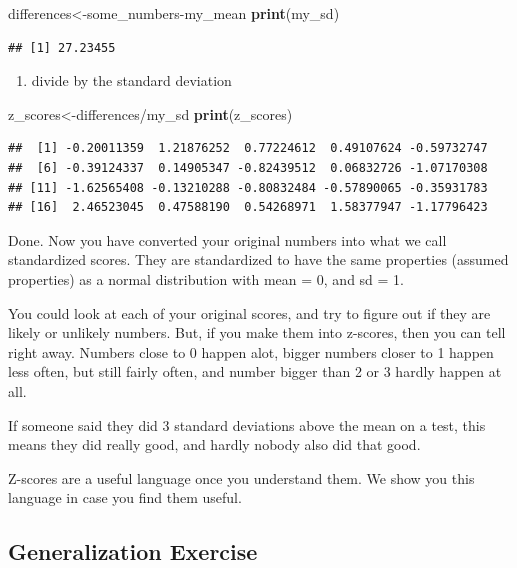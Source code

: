 \documentclass[]{book}
\newenvironment{Shaded}{\begin{snugshade}}{\end{snugshade}}
\newcommand{\KeywordTok}[1]{\textcolor[rgb]{0.13,0.29,0.53}{\textbf{{#1}}}}
\newcommand{\NormalTok}[1]{{#1}}
\providecommand{\tightlist}{%
  \setlength{\itemsep}{0pt}\setlength{\parskip}{0pt}}
\theoremstyle{definition}
\theoremstyle{definition}
\theoremstyle{definition}
\theoremstyle{remark}
\begin{document}
\begin{Shaded}
\begin{Highlighting}[]
\NormalTok{differences<-some_numbers-my_mean}
\KeywordTok{print}\NormalTok{(my_sd)}
\end{Highlighting}
\end{Shaded}

\begin{verbatim}
## [1] 27.23455
\end{verbatim}

\begin{enumerate}
\def\labelenumi{\arabic{enumi}.}
\setcounter{enumi}{3}
\tightlist
\item
  divide by the standard deviation
\end{enumerate}

\begin{Shaded}
\begin{Highlighting}[]
\NormalTok{z_scores<-differences/my_sd}
\KeywordTok{print}\NormalTok{(z_scores)}
\end{Highlighting}
\end{Shaded}

\begin{verbatim}
##  [1] -0.20011359  1.21876252  0.77224612  0.49107624 -0.59732747
##  [6] -0.39124337  0.14905347 -0.82439512  0.06832726 -1.07170308
## [11] -1.62565408 -0.13210288 -0.80832484 -0.57890065 -0.35931783
## [16]  2.46523045  0.47588190  0.54268971  1.58377947 -1.17796423
\end{verbatim}

Done. Now you have converted your original numbers into what we call
standardized scores. They are standardized to have the same properties
(assumed properties) as a normal distribution with mean = 0, and sd = 1.

You could look at each of your original scores, and try to figure out if
they are likely or unlikely numbers. But, if you make them into
z-scores, then you can tell right away. Numbers close to 0 happen alot,
bigger numbers closer to 1 happen less often, but still fairly often,
and number bigger than 2 or 3 hardly happen at all.

If someone said they did 3 standard deviations above the mean on a test,
this means they did really good, and hardly nobody also did that good.

Z-scores are a useful language once you understand them. We show you
this language in case you find them useful.

\subsection{Generalization Exercise}\label{generalization-exercise-2}
\end{document}
